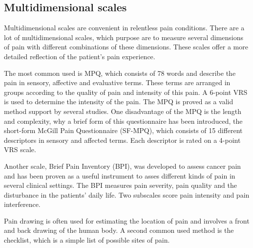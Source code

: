 \subsection{Multidimensional scales} 
Multidimensional scales are convenient in relentless pain conditions. There are a lot of multidimensional scales, which purpose are to measure several dimensions of pain with different combinations of these dimensions. These scales offer a more detailed reflection of the patient's pain experience. \cite{Briggs2010} 

The most common used is MPQ, which consists of 78 words and describe the pain in sensory, affective and evaluative terms. These terms are arranged in groups according to the quality of pain and intensity of this pain. A 6-point VRS is used to determine the intensity of the pain. The MPQ is proved as a valid method support by several studies. One disadvantage of the MPQ is the length and complexity, why a brief form of this questionnaire has been introduced, the short-form McGill Pain Questionnaire (SF-MPQ), which consists of 15 different descriptors in sensory and affected terms. Each descriptor is rated on a 4-point VRS scale.~\cite{Katz2001}

Another scale, Brief Pain Inventory (BPI), was developed to assess cancer pain and has been proven as a useful instrument to asses different kinds of pain in several clinical settings. The BPI measures pain severity, pain quality and the disturbance in the patients' daily life. Two subscales score pain intensity and pain interference.~\cite{Katz2001} 

Pain drawing is often used for estimating the location of pain and involves a front and back drawing of the human body. A second common used method is the checklist, which is a simple list of possible sites of pain.~\cite{Jensen2001} 



